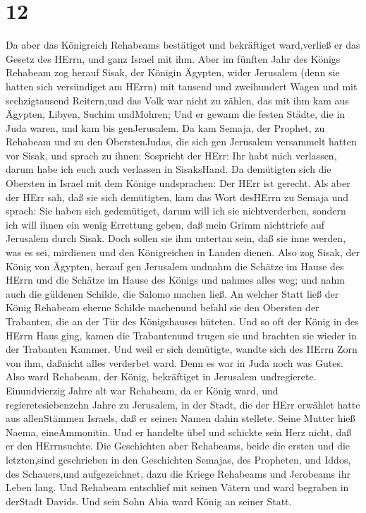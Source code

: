 \hypertarget{section-11}{%
\section{12}\label{section-11}}

 Da aber das Königreich Rehabeams bestätiget und bekräftiget
ward,verließ er das Gesetz des HErrn, und ganz Israel mit ihm.
 Aber im fünften Jahr des Königs Rehabeam zog herauf Sisak,
der Königin Ägypten, wider Jerusalem (denn sie hatten sich versündiget
am HErrn)  mit tausend und zweihundert Wagen und mit
sechzigtausend Reitern,und das Volk war nicht zu zählen, das mit ihm kam
aus Ägypten, Libyen, Suchim undMohren;  Und er gewann die
festen Städte, die in Juda waren, und kam bis genJerusalem. 
Da kam Semaja, der Prophet, zu Rehabeam und zu den OberstenJudas, die
sich gen Jerusalem versammelt hatten vor Sisak, und sprach zu ihnen:
Sospricht der HErr: Ihr habt mich verlassen, darum habe ich euch auch
verlassen in SisaksHand.  Da demütigten sich die Obersten in
Israel mit dem Könige undsprachen: Der HErr ist gerecht. 
Als aber der HErr sah, daß sie sich demütigten, kam das Wort desHErrn zu
Semaja und sprach: Sie haben sich gedemütiget, darum will ich sie
nichtverderben, sondern ich will ihnen ein wenig Errettung geben, daß
mein Grimm nichttriefe auf Jerusalem durch Sisak.  Doch
sollen sie ihm untertan sein, daß sie inne werden, was es sei, mirdienen
und den Königreichen in Landen dienen.  Also zog Sisak, der
König von Ägypten, herauf gen Jerusalem undnahm die Schätze im Hause des
HErrn und die Schätze im Hause des Königs und nahmes alles weg; und nahm
auch die güldenen Schilde, die Salomo machen ließ.  An
welcher Statt ließ der König Rehabeam eherne Schilde machenund befahl
sie den Obersten der Trabanten, die an der Tür des Königshauses hüteten.
 Und so oft der König in des HErrn Haus ging, kamen die
Trabantenund trugen sie und brachten sie wieder in der Trabanten Kammer.
 Und weil er sich demütigte, wandte sich des HErrn Zorn von
ihm, daßnicht alles verderbet ward. Denn es war in Juda noch was Gutes.
 Also ward Rehabeam, der König, bekräftiget in Jerusalem
undregierete. Einundvierzig Jahre alt war Rehabeam, da er König ward,
und regieretesiebenzehn Jahre zu Jerusalem, in der Stadt, die der HErr
erwählet hatte aus allenStämmen Israels, daß er seinen Namen dahin
stellete. Seine Mutter hieß Naema, eineAmmonitin.  Und er
handelte übel und schickte sein Herz nicht, daß er den HErrnsuchte.
 Die Geschichten aber Rehabeams, beide die ersten und die
letzten,sind geschrieben in den Geschichten Semajas, des Propheten, und
Iddos, des Schauers,und aufgezeichnet, dazu die Kriege Rehabeams und
Jerobeams ihr Leben lang.  Und Rehabeam entschlief mit
seinen Vätern und ward begraben in derStadt Davids. Und sein Sohn Abia
ward König an seiner Statt.

